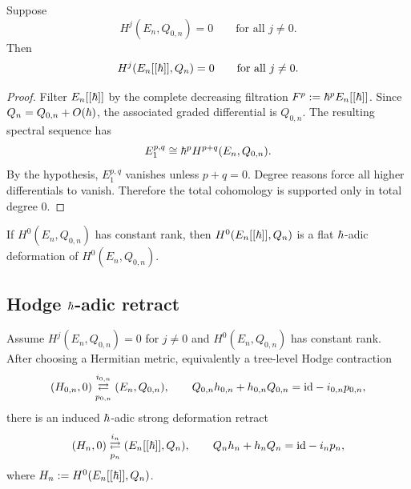 \begin{theorem}%
Suppose
\[
 H^j(E_n,Q_{0,n})=0 \qquad \text{for all } j\neq 0.
\]
Then
\[
 H^j(E_n[[\hbar]],Q_n)=0 \qquad \text{for all } j\neq 0.
\]
\end{theorem}

\begin{proof}
Filter $E_n[[\hbar]]$ by the complete decreasing filtration $F^p:=\hbar^pE_n[[\hbar]]$. Since $Q_n=Q_{0,n}+O(\hbar)$, the associated graded differential is $Q_{0,n}$. The resulting spectral sequence has
\[
 E_1^{p,q}\cong \hbar^p H^{p+q}(E_n,Q_{0,n}).
\]
By the hypothesis, $E_1^{p,q}$ vanishes unless $p+q=0$. Degree reasons force all higher differentials to vanish. Therefore the total cohomology is supported only in total degree $0$.
\end{proof}

\begin{corollary}%
If $H^0(E_n,Q_{0,n})$ has constant rank, then $H^0(E_n[[\hbar]],Q_n)$ is a flat $\hbar$-adic deformation of $H^0(E_n,Q_{0,n})$.
\end{corollary}

\subsection{Hodge $\hbar$-adic retract}

\begin{theorem}%
Assume $H^j(E_n,Q_{0,n})=0$ for $j\neq 0$ and $H^0(E_n,Q_{0,n})$ has constant rank. After choosing a Hermitian metric, equivalently a tree-level Hodge contraction
\[
 (H_{0,n},0)\underset{p_{0,n}}{\stackrel{i_{0,n}}{\rightleftarrows}}(E_n,Q_{0,n}),
 \qquad
 Q_{0,n}h_{0,n}+h_{0,n}Q_{0,n}=\mathrm{id}-i_{0,n}p_{0,n},
\]
there is an induced $\hbar$-adic strong deformation retract
\[
 (H_n,0) \underset{p_n}{\stackrel{i_n}{\rightleftarrows}} (E_n[[\hbar]],Q_n),
 \qquad
 Q_n h_n+h_nQ_n = \mathrm{id} - i_np_n,
\]
where $H_n:=H^0(E_n[[\hbar]],Q_n)$.
\end{theorem}

